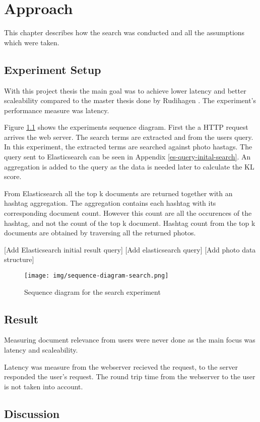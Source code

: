 \chapter{Approach}
This chapter describes how the search was conducted and all the assumptions which were taken.

\section{Experiment Setup}
With this project thesis the main goal was to achieve lower latency and better scaleability compared to the master thesis done by Rudihagen \cite{master-thesis}.
The experiment's performance measure was latency.

Figure \ref{fig:sequence-diagram-search} shows the experiments sequence diagram.
First the a HTTP request arrives the web server.
The search terms are extracted and from the users query.
In this experiment, the extracted terms are searched against photo hastags.
The query sent to Elasticsearch can be seen in Appendix \ref{es-query-inital-search}.
An aggregation is added to the query as the data is needed later to calculate the KL score.

From Elasticsearch all the top k documents are returned together with an hashtag aggregation.
The aggregation contains each hashtag with its corresponding document count.
However this count are all the occurences of the hashtag, and not the count of the top k document.
Hashtag count from the top k documents are obtained by traversing all the returned photos.

[Add Elasticsearch initial result query]
[Add elasticsearch query]
[Add photo data structure]

\begin{figure}[h!]
\centering \texttt{[image: img/sequence-diagram-search.png]}
\caption{Sequence diagram for the search experiment}
\label{fig:sequence-diagram-search}
\end{figure}

\section{Result}
Measuring document relevance from users were never done as the main focus was latency and scaleability.

Latency was measure from the webserver recieved the request, to the server responded the user's request.
The round trip time from the webserver to the user is not taken into account.

\section{Discussion}
